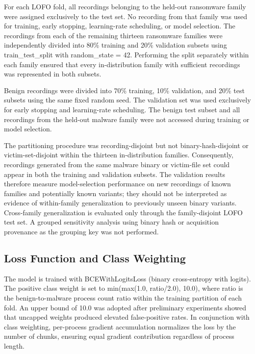 For each LOFO fold, all recordings belonging to the held-out ransomware family were assigned exclusively to the test set. No recording from that family was used for training, early stopping, learning-rate scheduling, or model selection. The recordings from each of the remaining thirteen ransomware families were independently divided into 80\% training and 20\% validation subsets using train\_\allowbreak{}test\_\allowbreak{}split \cite{ref46} with random\_\allowbreak{}state = 42. Performing the split separately within each family ensured that every in-distribution family with sufficient recordings was represented in both subsets.

Benign recordings were divided into 70\% training, 10\% validation, and 20\% test subsets using the same fixed random seed. The validation set was used exclusively for early stopping and learning-rate scheduling. The benign test subset and all recordings from the held-out malware family were not accessed during training or model selection.

The partitioning procedure was recording-disjoint but not binary-hash-disjoint or victim-set-disjoint within the thirteen in-distribution families. Consequently, recordings generated from the same malware binary or victim-file set could appear in both the training and validation subsets. The validation results therefore measure model-selection performance on new recordings of known families and potentially known variants; they should not be interpreted as evidence of within-family generalization to previously unseen binary variants. Cross-family generalization is evaluated only through the family-disjoint LOFO test set. A grouped sensitivity analysis using binary hash or acquisition provenance as the grouping key was not performed.

\subsection{Loss Function and Class Weighting}\label{sec:3.6.3}

The model is trained with BCEWithLogitsLoss (binary cross-entropy with logits). The positive class weight is set to min(max(1.0, ratio/\allowbreak{}2.0), 10.0), where ratio is the benign-to-malware process count ratio within the training partition of each fold. An upper bound of 10.0 was adopted after preliminary experiments showed that uncapped weights produced elevated false-positive rates. In conjunction with class weighting, per-process gradient accumulation normalizes the loss by the number of chunks, ensuring equal gradient contribution regardless of process length.

